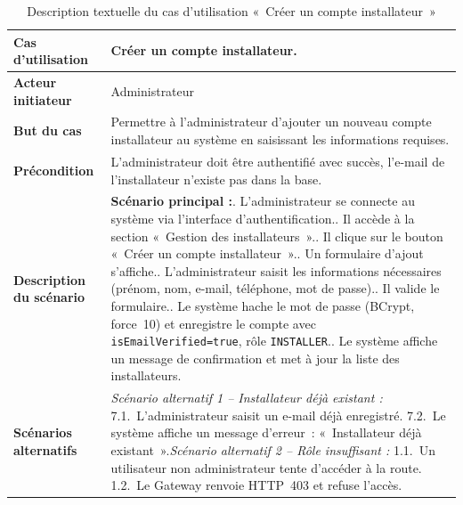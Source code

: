 \begin{table}[H]
  \caption{Description textuelle du cas d'utilisation «~Créer un compte installateur~»}
  \label{tab:cu-creer-installateur}
  \centering
  \begin{tabularx}{\textwidth}{|L{3.8cm}|X|}
    \hline
    \textbf{Cas d'utilisation} & Créer un compte installateur. \\
    \hline
    \textbf{Acteur initiateur} & Administrateur \\
    \hline
    \textbf{But du cas} & Permettre à l'administrateur d'ajouter un nouveau compte installateur au système en saisissant les informations requises. \\
    \hline
    \textbf{Précondition} & L'administrateur doit être authentifié avec succès, l'e-mail de l'installateur n'existe pas dans la base. \\
    \hline
    \textbf{Description du scénario} &
    \textbf{Scénario principal :}. L'administrateur se connecte au système via l'interface d'authentification.. Il accède à la section «~Gestion des installateurs~».. Il clique sur le bouton «~Créer un compte installateur~».. Un formulaire d'ajout s'affiche.. L'administrateur saisit les informations nécessaires (prénom, nom, e-mail, téléphone, mot de passe).. Il valide le formulaire.. Le système hache le mot de passe (BCrypt, force~10) et enregistre le compte avec \texttt{isEmailVerified=true}, rôle \texttt{INSTALLER}.. Le système affiche un message de confirmation et met à jour la liste des installateurs.\\
    \hline
    \textbf{Scénarios alternatifs} &
    \textit{Scénario alternatif 1 -- Installateur déjà existant :}\newline
    \hspace*{6pt}7.1.~L'administrateur saisit un e-mail déjà enregistré.\newline
    \hspace*{6pt}7.2.~Le système affiche un message d'erreur~: «~Installateur déjà existant~».\newline[2pt]
    \textit{Scénario alternatif 2 -- Rôle insuffisant :}\newline
    \hspace*{6pt}1.1.~Un utilisateur non administrateur tente d'accéder à la route.\newline
    \hspace*{6pt}1.2.~Le Gateway renvoie HTTP~403 et refuse l'accès.\\
    \hline
  \end{tabularx}
\end{table}

